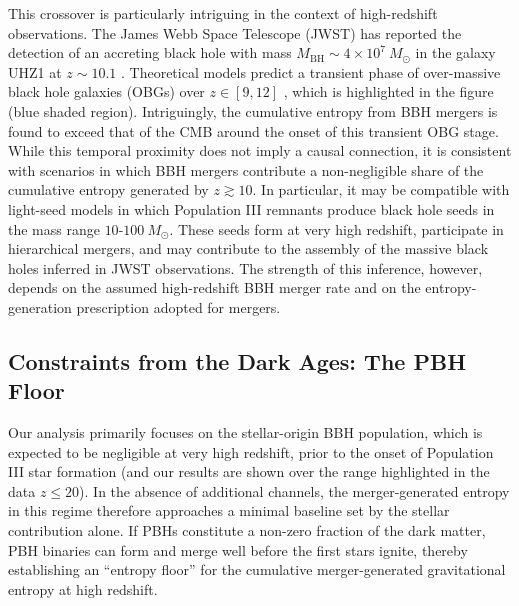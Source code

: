 \documentclass[twocolumn]{aastex631}
\begin{document}
This crossover is particularly intriguing in the context of high-redshift observations. The James Webb Space Telescope (JWST) has reported the detection of an accreting black hole with mass $M_\mathrm{BH} \sim 4 \times 10^7~M_\odot$ in the galaxy UHZ1 at $z \sim 10.1$ \citep{natarajan2023detectionovermassiveblackhole}. Theoretical models predict a transient phase of over-massive black hole galaxies (OBGs) over $z \in [9,12]$ \citep{2013MNRAS.432.3438A, Natarajan_2017}, which is highlighted in the figure (blue shaded region). Intriguingly, the cumulative entropy from BBH mergers is found to exceed that of the CMB around the onset of this transient OBG stage. While this temporal proximity does not imply a causal connection, it is consistent with scenarios in which BBH mergers contribute a non-negligible share of the cumulative entropy generated by $z \gtrsim 10$. In particular, it may be compatible with light-seed models in which Population III remnants produce black hole seeds in the mass range $10$-$100~M_\odot$. These seeds form at very high redshift, participate in hierarchical mergers, and may contribute to the assembly of the massive black holes inferred in JWST observations. The strength of this inference, however, depends on the assumed high-redshift BBH merger rate and on the entropy-generation prescription adopted for mergers.

\subsection{Constraints from the Dark Ages: The PBH Floor}
Our analysis primarily focuses on the stellar-origin BBH population, which is expected to be negligible at very high redshift, prior to the onset of Population III star formation (and our results are shown over the range highlighted in the data $z\le20$). In the absence of additional channels, the merger-generated entropy in this regime therefore approaches a minimal baseline set by the stellar contribution alone. If PBHs constitute a non-zero fraction of the dark matter, PBH binaries can form and merge well before the first stars ignite, thereby establishing an ``entropy floor” for the cumulative merger-generated gravitational entropy at high redshift.
\end{document}
